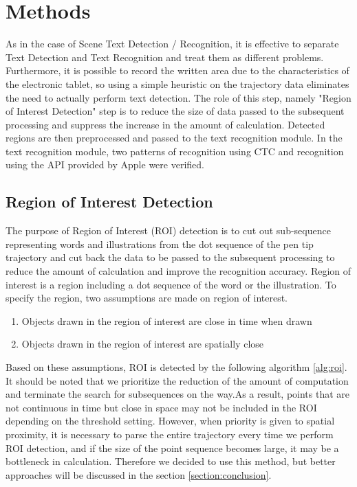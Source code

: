 \section{Methods}
\label{section:methods}

As in the case of Scene Text Detection / Recognition, it is effective to separate Text Detection
and Text Recognition and treat them as different problems.
Furthermore, it is possible to record the written area due to the characteristics of the electronic tablet,
so using a simple heuristic on the trajectory data eliminates the need to actually perform text detection.
The role of this step, namely "Region of Interest Detection" step is to reduce the size of data
passed to the subsequent processing and suppress the increase in the amount of calculation.
Detected regions are then preprocessed and passed to the text recognition module. In the text recognition module,
two patterns of recognition using CTC and recognition using the API provided by Apple were verified.

\subsection{Region of Interest Detection}

The purpose of Region of Interest (ROI) detection is to cut out sub-sequence
representing words and illustrations from the dot sequence of the pen tip trajectory
and cut back the data to be passed to the subsequent processing to
reduce the amount of calculation and improve the recognition accuracy.
Region of interest is a region including a dot sequence of the word or the illustration.
To specify the region, two assumptions are made on region of interest.

\begin{enumerate}
    \item Objects drawn in the region of interest are close in time when drawn
    \item Objects drawn in the region of interest are spatially close
\end{enumerate}

Based on these assumptions, ROI is detected by the following algorithm \ref{alg:roi}.
It should be noted that we prioritize the reduction of the amount of computation and
terminate the search for subsequences on the way.As a result, points that are not continuous
in time but close in space may not be included in the ROI depending on the threshold setting.
However, when priority is given to spatial proximity, it is necessary to parse the entire
trajectory every time we perform ROI detection, and if the size of the point sequence becomes large,
it may be a bottleneck in calculation. Therefore we decided to use this method,
but better approaches will be discussed in the section \ref{section:conclusion}.

